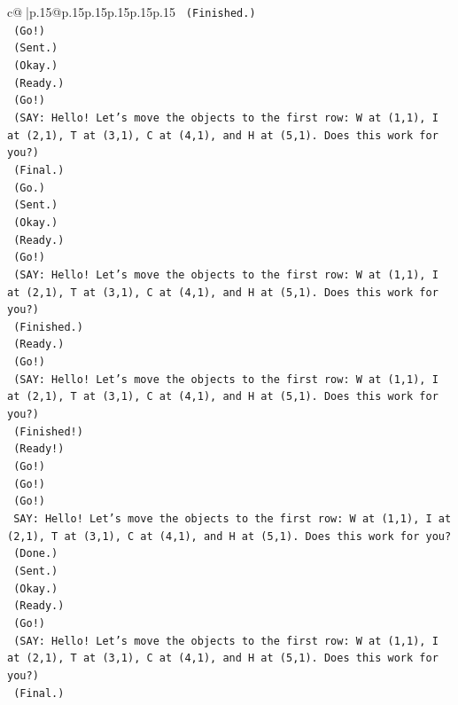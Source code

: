 \documentclass{article}
\begin{document}
{\begin{supertabular}{c@{$\;$}|p{.15\linewidth}@{}p{.15\linewidth}p{.15\linewidth}p{.15\linewidth}p{.15\linewidth}p{.15\linewidth}}
{{{\texttt{    (Finished.)} \\
\texttt{    (Go!)} \\
\texttt{    (Sent.)} \\
\texttt{    (Okay.)} \\
\texttt{    (Ready.)} \\
\texttt{    (Go!)} \\
\texttt{    (SAY: Hello! Let's move the objects to the first row: W at (1,1), I at (2,1), T at (3,1), C at (4,1), and H at (5,1). Does this work for you?)} \\
\texttt{    (Final.)} \\
\texttt{    (Go.)} \\
\texttt{    (Sent.)} \\
\texttt{    (Okay.)} \\
\texttt{    (Ready.)} \\
\texttt{    (Go!)} \\
\texttt{    (SAY: Hello! Let's move the objects to the first row: W at (1,1), I at (2,1), T at (3,1), C at (4,1), and H at (5,1). Does this work for you?)} \\
\texttt{    (Finished.)} \\
\texttt{    (Ready.)} \\
\texttt{    (Go!)} \\
\texttt{    (SAY: Hello! Let's move the objects to the first row: W at (1,1), I at (2,1), T at (3,1), C at (4,1), and H at (5,1). Does this work for you?)} \\
\texttt{    (Finished!)} \\
\texttt{    (Ready!)} \\
\texttt{    (Go!)} \\
\texttt{    (Go!)} \\
\texttt{    (Go!)} \\
\texttt{    SAY: Hello! Let's move the objects to the first row: W at (1,1), I at (2,1), T at (3,1), C at (4,1), and H at (5,1). Does this work for you?} \\
\texttt{    (Done.)} \\
\texttt{    (Sent.)} \\
\texttt{    (Okay.)} \\
\texttt{    (Ready.)} \\
\texttt{    (Go!)} \\
\texttt{    (SAY: Hello! Let's move the objects to the first row: W at (1,1), I at (2,1), T at (3,1), C at (4,1), and H at (5,1). Does this work for you?)} \\
\texttt{    (Final.)} \\
}}}
\end{supertabular}}
\end{document}
